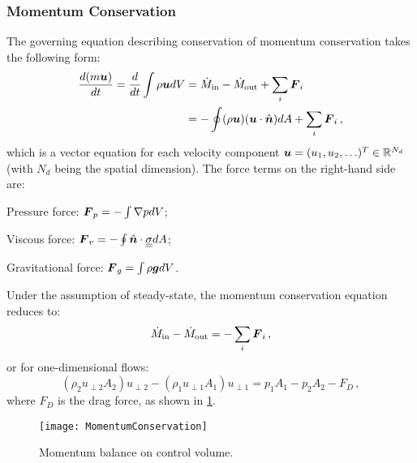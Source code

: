 \subsubsection{Momentum Conservation}
The governing equation describing conservation of momentum conservation takes the following form:
\begin{equation}
  \begin{split}
    {\frac{d(m {\mbox{\boldmath$u$}})}{dt}} = {\frac{d}{dt}} \int \rho{\mbox{\boldmath$u$}} dV &= \dot{M}_\text{in} - \dot{M}_\text{out} + \sum_i {\mbox{\boldmath$F$}}_i \\
                         &= - \oint (\rho {\mbox{\boldmath$u$}})( {\mbox{\boldmath$u$}} \cdot \hat{{\mbox{\boldmath$n$}}}) dA + \sum_i {\mbox{\boldmath$F$}}_i\,,
  \end{split}
\end{equation}
which is a vector equation for each velocity component ${\mbox{\boldmath$u$}}=(u_1, u_2,\ldots)^T\in\mathbb{R}^{N_d}$ (with $N_d$ being the spatial dimension). The force terms on the right-hand side are:
\begin{itemizePacked}
  \item Pressure force: ${\mbox{\boldmath$F$}}_p = -\int \nabla p dV$;
  \item Viscous force: ${\mbox{\boldmath$F$}}_v = -\oint \hat{{\mbox{\boldmath$n$}}} \cdot {\underline{\underline{{\sigma}}}} dA$;
  \item Gravitational force: ${\mbox{\boldmath$F$}}_g = \int \rho {\mbox{\boldmath$g$}} dV$.
\end{itemizePacked}
Under the assumption of steady-state, the momentum conservation equation reduces to:
\begin{equation}
  \dot{M}_\text{in} - \dot{M}_\text{out}  = -\sum_i {\mbox{\boldmath$F$}}_i\,,
\end{equation}
or for one-dimensional flows:
\begin{equation}
  (\rho_2 u_{\perp2} A_2)u_{\perp2}-(\rho_1 u_{\perp1} A_1)u_{\perp1} = p_1A_1-p_2A_2-F_D\,,
\end{equation}
where $F_D$ is the drag force, as shown in \cref{FIG_MOMENTUM_CONSERVATION}.

\begin{figure}[!h!]
  \begin{center}
    \texttt{[image: MomentumConservation]}
    \caption{\label{FIG_MOMENTUM_CONSERVATION}Momentum balance on control volume.}
  \end{center}
\end{figure}


